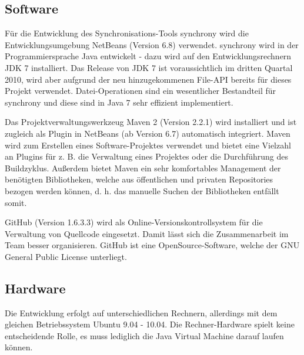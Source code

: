 \documentclass[12pt,oneside,a4paper,bibtotoc,liststotoc,pointlessnumbers]{scrartcl}
\begin{document}
\subsection{Software}
Für die Entwicklung des Synchronisations-Tools synchrony wird die Entwicklungsumgebung NetBeans (Version 6.8) verwendet.
synchrony wird in der Programmiersprache Java entwickelt - dazu wird auf den Entwicklungsrechnern JDK 7 installiert.
Das Release von JDK 7 ist voraussichtlich im dritten Quartal 2010, wird aber aufgrund der neu hinzugekommenen File-API bereits für
dieses Projekt verwendet. Datei-Operationen sind ein wesentlicher Bestandteil für synchrony und diese sind in Java 7 sehr effizient
implementiert.

Das Projektverwaltungswerkzeug Maven 2 (Version 2.2.1) wird installiert und ist zugleich als Plugin in NetBeans (ab Version 6.7) automatisch
integriert. Maven wird zum Erstellen eines Software-Projektes verwendet und bietet eine Vielzahl an Plugins für z. B. die Verwaltung eines
Projektes oder die Durchführung des Buildzyklus. Außerdem bietet Maven ein sehr komfortables Management der benötigten Bibliotheken, welche
aus öffentlichen und privaten Repositories bezogen werden können, d. h. das manuelle Suchen der Bibliotheken entfällt somit.

GitHub (Version 1.6.3.3) wird als Online-Versionskontrollsystem für die Verwaltung von Quellcode eingesetzt. Damit lässt sich die Zusammenarbeit im
Team besser organisieren. GitHub ist eine OpenSource-Software, welche der GNU General Public License unterliegt.

\subsection{Hardware}
Die Entwicklung erfolgt auf unterschiedlichen Rechnern, allerdings mit dem gleichen Betriebssystem Ubuntu 9.04 - 10.04.
Die Rechner-Hardware spielt keine entscheidende Rolle, es muss lediglich die Java Virtual Machine darauf laufen können. 

\newpage
\listoffigures

\newpage
\listoftables
\end{document}
